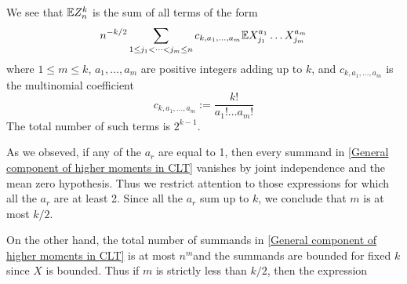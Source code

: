 We see that $\mathbb{E} Z_n^k$ is the sum of all terms of the form
\begin{equation}\label{General component of higher moments in CLT}
    n^{-k/2}\sum_{1\leq j_1<\cdots<j_m\leq n} c_{k,a_1,\dots,a_m}\mathbb{E} X_{j_1}^{a_1}\dots X_{j_m}^{a_m}
\end{equation}
where $1\leq m \leq k$, $a_1,\dots,a_m$ are positive integers adding up to $k$, and $c_{k,a_1,\dots,a_m}$ is the multinomial coefficient
\begin{equation*}
    c_{k,a_1,\dots,a_m}:=\frac{k!}{a_1!\dots a_m!}
\end{equation*}
The total number of such terms is $2^{k-1}$.

As we obseved, if any of the $a_r$ are equal to 1, then every summand in \ref{General component of higher moments in CLT} vanishes by joint independence and the mean zero hypothesis. Thus we restrict attention to those expressions for which all the $a_r$ are at least 2. Since all the $a_r$ sum up to $k$, we conclude that $m$ is at most $k/2$.

On the other hand, the total number of summands in \ref{General component of higher moments in CLT} is at most $n^m$and the summands are bounded for fixed $k$ since $X$ is bounded. Thus if $m$ is strictly less than $k/2$, then the expression 


